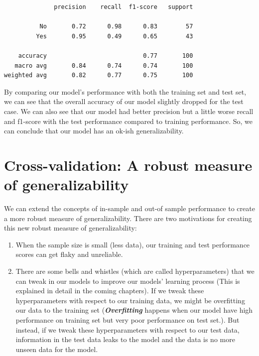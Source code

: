 \documentclass[
  letterpaper,
]{book}
\providecommand{\tightlist}{%
  \setlength{\itemsep}{0pt}\setlength{\parskip}{0pt}}\usepackage{longtable,booktabs,array}
\begin{document}
\begin{verbatim}
              precision    recall  f1-score   support

          No       0.72      0.98      0.83        57
         Yes       0.95      0.49      0.65        43

    accuracy                           0.77       100
   macro avg       0.84      0.74      0.74       100
weighted avg       0.82      0.77      0.75       100
\end{verbatim}

By comparing our model's performance with both the training set and test
set, we can see that the overall accuracy of our model slightly dropped
for the test case. We can also see that our model had better precision
but a little worse recall and f1-score with the test performance
compared to training performance. So, we can conclude that our model has
an ok-ish generalizability.

\hypertarget{cross-validation-a-robust-measure-of-generalizability}{%
\section{Cross-validation: A robust measure of
generalizability}\label{cross-validation-a-robust-measure-of-generalizability}}

We can extend the concepts of in-sample and out-of sample performance to
create a more robust measure of generalizability. There are two
motivations for creating this new robust measure of generalizability:

\begin{enumerate}
\def\labelenumi{\arabic{enumi}.}
\tightlist
\item
  When the sample size is small (less data), our training and test
  performance scores can get flaky and unreliable.
\item
  There are some bells and whistles (which are called hyperparameters)
  that we can tweak in our models to improve our models' learning
  process (This is explained in detail in the coming chapters). If we
  tweak these hyperparameters with respect to our training data, we
  might be overfitting our data to the training set
  (\textbf{\emph{Overfitting}} happens when our model have high
  performance on training set but very poor performance on test set.).
  But instead, if we tweak these hyperparameters with respect to our
  test data, information in the test data leaks to the model and the
  data is no more unseen data for the model.
\end{enumerate}
\end{document}
